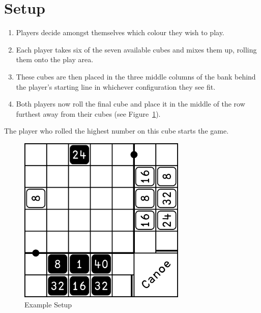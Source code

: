 \section{Setup}
\begin{enumerate}
    \item Players decide amongst themselves which colour they wish to play.
    \item Each player takes six of the seven available cubes and mixes them up, rolling them onto the play area.
    \item These cubes are then placed in the three middle columns of the bank behind the player's starting line in whichever configuration they see fit.
    \item Both players now roll the final cube and place it in the middle of the row furthest away from their cubes (see Figure~\ref{fig:setup}).
\end{enumerate}
The player who rolled the highest number on this cube starts the game.

\begin{figure}[!h]
    \centering
    \includegraphics[width=8cm]{../graphics/setup}
    \caption{Example Setup}
    \label{fig:setup}
\end{figure}